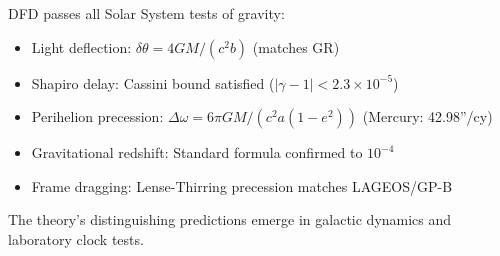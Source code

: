 \begin{tcolorbox}[colback=blue!5!white, colframe=blue!50!black, title=Summary: Solar System Compliance]
DFD passes all Solar System tests of gravity:
\begin{itemize}
\item Light deflection: $\delta\theta = 4GM/(c^2 b)$ (matches GR)
\item Shapiro delay: Cassini bound satisfied ($|\gamma - 1| < 2.3 \times 10^{-5}$)
\item Perihelion precession: $\Delta\omega = 6\pi GM/(c^2 a(1-e^2))$ (Mercury: 42.98''/cy)
\item Gravitational redshift: Standard formula confirmed to $10^{-4}$
\item Frame dragging: Lense-Thirring precession matches LAGEOS/GP-B
\end{itemize}
The theory's distinguishing predictions emerge in galactic dynamics and laboratory clock tests.
\end{tcolorbox}
